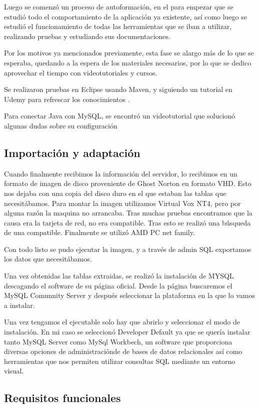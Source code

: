 Luego se comenzó un proceso de autoformación, en el para empezar que se estudió todo el comportamiento de la aplicación ya existente, así como luego se estudió el funcionamiento de todas las herramientas que se iban a utilizar, realizando pruebas y estudiando sus documentaciones.

Por los motivos ya mencionados previamente, esta fase se alargo más de lo que se esperaba, quedando a la espera de los materiales necesarios, por lo que se dedico aprovechar el tiempo con videotutoriales y cursos.


Se realizaron pruebas en Eclipse usando Maven, y siguiendo un tutorial en Udemy para refrescar los conocimientos \cite{curso:JSPin25Steps}.

Para conectar Java con MySQL, se encontró un videotutorial que solucionó algunas dudas sobre su configuración \cite{tutorial:javaMySQL}


\subsection{Importación y adaptación}

Cuando finalmente recibimos la información del servidor, lo recibimos en un formato de imagen de disco proveniente de Ghost Norton en formato VHD. Esto nos dejaba con una copia del disco duro en el que estaban las tablas que necesitábamos.
Para montar la imagen utilizamos Virtual Vox NT4, pero por alguna razón la maquina no arrancaba. Tras muchas pruebas encontramos que la causa era la tarjeta de red, no era compatible. Tras esto se realizó una búsqueda de una compatible. Finalmente se utilizó AMD PC net family. 

Con todo listo se pudo ejecutar la imagen, y a través de admin SQL exportamos los datos que necesitábamos.

Una vez obtenidas las tablas extraidas, se realizó la instalación de MYSQL descagando el software de su página oficial. Desde la página buscaremos el MySQL Comunnity Server y después seleccionar la plataforma en la que lo vamos a instalar.

Una vez tengamos el ejecutable solo hay que abrirlo y seleccionar el modo de instalación. En mi caso se seleccionó Developer Default ya que se quería instalar tanto MySQL Server como MySql Workbech, un software que proporciona diversas opciones de administraciónde de bases de datos relacionales así como herramientas que nos permiten utilizar consultas SQL mediante un entorno visual.

\subsection{Requisitos funcionales}

